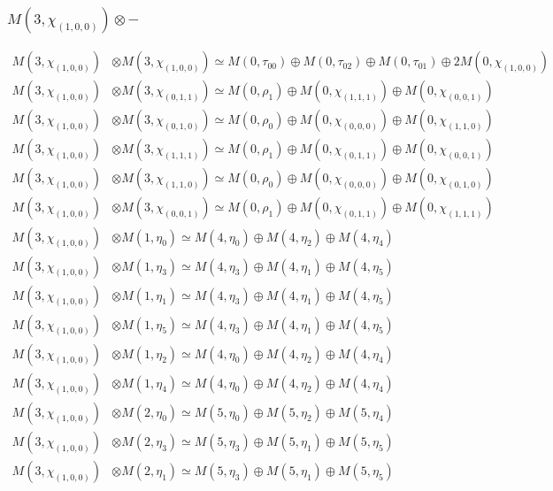 \subsubsection{$ M(3,\chi_{(1,0,0)})\otimes -$}
\begin{align*}
M(3,\chi_{(1,0,0)}) &\otimes M(3,\chi_{(1,0,0)}) \simeq M(0,\tau_{00}) \oplus M(0,\tau_{02}) \oplus M(0,\tau_{01}) \oplus 2 M(0,\chi_{(1,0,0)})\\
M(3,\chi_{(1,0,0)}) &\otimes M(3,\chi_{(0,1,1)}) \simeq M(0,\rho_{1}) \oplus M(0,\chi_{(1,1,1)}) \oplus M(0,\chi_{(0,0,1)})\\
M(3,\chi_{(1,0,0)}) &\otimes M(3,\chi_{(0,1,0)}) \simeq M(0,\rho_{0}) \oplus M(0,\chi_{(0,0,0)}) \oplus M(0,\chi_{(1,1,0)})\\
M(3,\chi_{(1,0,0)}) &\otimes M(3,\chi_{(1,1,1)}) \simeq M(0,\rho_{1}) \oplus M(0,\chi_{(0,1,1)}) \oplus M(0,\chi_{(0,0,1)})\\
M(3,\chi_{(1,0,0)}) &\otimes M(3,\chi_{(1,1,0)}) \simeq M(0,\rho_{0}) \oplus M(0,\chi_{(0,0,0)}) \oplus M(0,\chi_{(0,1,0)})\\
M(3,\chi_{(1,0,0)}) &\otimes M(3,\chi_{(0,0,1)}) \simeq M(0,\rho_{1}) \oplus M(0,\chi_{(0,1,1)}) \oplus M(0,\chi_{(1,1,1)})\\
M(3,\chi_{(1,0,0)}) &\otimes M(1,\eta_{0}) \simeq M(4,\eta_{0}) \oplus M(4,\eta_{2}) \oplus M(4,\eta_{4})\\
M(3,\chi_{(1,0,0)}) &\otimes M(1,\eta_{3}) \simeq M(4,\eta_{3}) \oplus M(4,\eta_{1}) \oplus M(4,\eta_{5})\\
M(3,\chi_{(1,0,0)}) &\otimes M(1,\eta_{1}) \simeq M(4,\eta_{3}) \oplus M(4,\eta_{1}) \oplus M(4,\eta_{5})\\
M(3,\chi_{(1,0,0)}) &\otimes M(1,\eta_{5}) \simeq M(4,\eta_{3}) \oplus M(4,\eta_{1}) \oplus M(4,\eta_{5})\\
M(3,\chi_{(1,0,0)}) &\otimes M(1,\eta_{2}) \simeq M(4,\eta_{0}) \oplus M(4,\eta_{2}) \oplus M(4,\eta_{4})\\
M(3,\chi_{(1,0,0)}) &\otimes M(1,\eta_{4}) \simeq M(4,\eta_{0}) \oplus M(4,\eta_{2}) \oplus M(4,\eta_{4})\\
M(3,\chi_{(1,0,0)}) &\otimes M(2,\eta_{0}) \simeq M(5,\eta_{0}) \oplus M(5,\eta_{2}) \oplus M(5,\eta_{4})\\
M(3,\chi_{(1,0,0)}) &\otimes M(2,\eta_{3}) \simeq M(5,\eta_{3}) \oplus M(5,\eta_{1}) \oplus M(5,\eta_{5})\\
M(3,\chi_{(1,0,0)}) &\otimes M(2,\eta_{1}) \simeq M(5,\eta_{3}) \oplus M(5,\eta_{1}) \oplus M(5,\eta_{5})\\

\end{align*}
